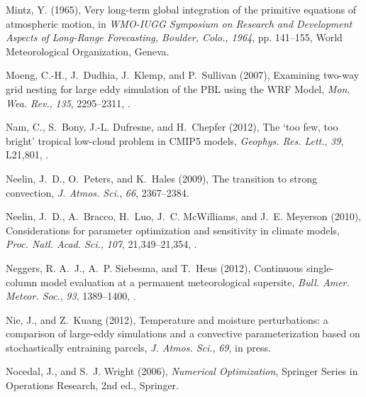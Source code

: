 \documentclass[draft]{agujournal}
\begin{document}
\begin{thebibliography}{196}
Mintz, Y. (1965), Very long-term global integration of the primitive equations
  of atmospheric motion, in \textit{WMO-IUGG Symposium on Research and
  Development Aspects of Long-Range Forecasting, Boulder, Colo., 1964}, pp.
  141--155, World Meteorological Organization, Geneva.

Moeng, C.-H., J.~Dudhia, J.~Klemp, and P.~Sullivan (2007), Examining two-way
  grid nesting for large eddy simulation of the {PBL} using the {WRF} {M}odel,
  \textit{Mon. Wea. Rev.}, \textit{135}, 2295--2311, .

Nam, C., S.~Bony, J.-L. Dufresne, and H.~Chepfer (2012), The `too few, too
  bright' tropical low-cloud problem in {CMIP5} models, \textit{Geophys. Res.
  Lett.}, \textit{39}, L21,801, .

Neelin, J.~D., O.~Peters, and K.~Hales (2009), The transition to strong
  convection, \textit{J. Atmos. Sci.}, \textit{66}, 2367--2384.

Neelin, J.~D., A.~Bracco, H.~Luo, J.~C. {McWilliams}, and J.~E. Meyerson
  (2010), Considerations for parameter optimization and sensitivity in climate
  models, \textit{Proc. Natl. Acad. Sci.}, \textit{107}, 21,349--21,354,
  .

Neggers, R. A.~J., A.~P. Siebesma, and T.~Heus (2012), Continuous single-column
  model evaluation at a permanent meteorological supersite, \textit{Bull. Amer.
  Meteor. Soc.}, \textit{93}, 1389--1400, .

Nie, J., and Z.~Kuang (2012), Temperature and moisture perturbations: a
  comparison of large-eddy simulations and a convective parameterization based
  on stochastically entraining parcels, \textit{J. Atmos. Sci.}, \textit{69},
  in press.

Nocedal, J., and S.~J. Wright (2006), \textit{Numerical Optimization}, Springer
  Series in Operations Research, 2nd ed., Springer.


\end{thebibliography}
\end{document}
